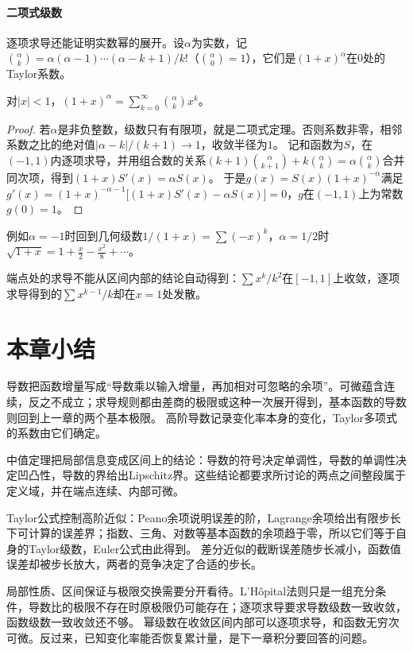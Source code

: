 \paragraph{二项式级数}
逐项求导还能证明实数幂的展开。设$\alpha$为实数，记$\binom\alpha k=\alpha(\alpha-1)\cdots(\alpha-k+1)/k!$（$\binom\alpha0=1$），它们是$(1+x)^\alpha$在$0$处的Taylor系数。
\begin{theorem}[二项式级数]
\label{thm:ru-binomial-series}
对$|x|<1$，$(1+x)^\alpha=\sum_{k=0}^\infty\binom\alpha kx^k$。
\end{theorem}
\begin{proof}
若$\alpha$是非负整数，级数只有有限项，就是二项式定理。否则系数非零，相邻系数之比的绝对值$|\alpha-k|/(k+1)\to1$，收敛半径为$1$。
记和函数为$S$，在$(-1,1)$内逐项求导，并用组合数的关系$(k+1)\binom\alpha{k+1}+k\binom\alpha k=\alpha\binom\alpha k$合并同次项，得到$(1+x)S'(x)=\alpha S(x)$。
于是$g(x)=S(x)(1+x)^{-\alpha}$满足$g'(x)=(1+x)^{-\alpha-1}\bigl[(1+x)S'(x)-\alpha S(x)\bigr]=0$，$g$在$(-1,1)$上为常数$g(0)=1$。
\end{proof}
例如$\alpha=-1$时回到几何级数$1/(1+x)=\sum(-x)^k$，$\alpha=1/2$时$\sqrt{1+x}=1+\tfrac x2-\tfrac{x^2}8+\cdots$。

端点处的求导不能从区间内部的结论自动得到：$\sum x^k/k^2$在$[-1,1]$上收敛，逐项求导得到的$\sum x^{k-1}/k$却在$x=1$处发散。

\FloatBarrier
\section{本章小结}
\label{sec:analysis-summary}

导数把函数增量写成“导数乘以输入增量，再加相对可忽略的余项”。可微蕴含连续，反之不成立；求导规则都由差商的极限或这种一次展开得到，基本函数的导数则回到上一章的两个基本极限。
高阶导数记录变化率本身的变化，Taylor多项式的系数由它们确定。

中值定理把局部信息变成区间上的结论：导数的符号决定单调性，导数的单调性决定凹凸性，导数的界给出Lipschitz界。这些结论都要求所讨论的两点之间整段属于定义域，并在端点连续、内部可微。

Taylor公式控制高阶近似：Peano余项说明误差的阶，Lagrange余项给出有限步长下可计算的误差界；指数、三角、对数等基本函数的余项趋于零，所以它们等于自身的Taylor级数，Euler公式由此得到。
差分近似的截断误差随步长减小，函数值误差却被步长放大，两者的竞争决定了合适的步长。

局部性质、区间保证与极限交换需要分开看待。L'Hôpital法则只是一组充分条件，导数比的极限不存在时原极限仍可能存在；逐项求导要求导数级数一致收敛，函数级数一致收敛还不够。
幂级数在收敛区间内部可以逐项求导，和函数无穷次可微。反过来，已知变化率能否恢复累计量，是下一章积分要回答的问题。
